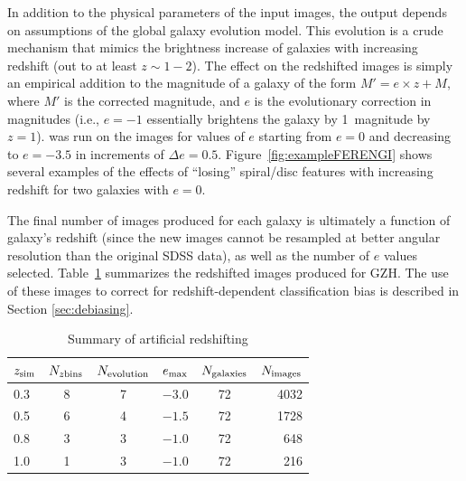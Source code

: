 \documentclass[twocolumn]{aastex6}
\begin{document}
In addition to the physical parameters of the input images, the \ferengi{}
output depends on assumptions of the global galaxy evolution model. This
evolution is a crude mechanism that mimics the brightness increase of galaxies
with increasing redshift (out to at least $z\sim1-2$). The effect on the
redshifted images is simply an empirical addition to the magnitude of a galaxy
of the form $M' = e\times z + M$, where $M'$ is the corrected magnitude, and
$e$ is the evolutionary correction in magnitudes (i.e., $e=-1$ essentially
brightens the galaxy by 1~magnitude by $z=1$). \ferengi{} was run on the images
for values of $e$ starting from $e=0$ and decreasing to $e=-3.5$ in increments
of $\Delta e = 0.5$. Figure~\ref{fig:exampleFERENGI} shows several examples
of the effects of ``losing'' spiral/disc features with increasing redshift
for two galaxies with $e=0$. 

The final number of \ferengi{} images produced for each galaxy is ultimately a
function of galaxy's redshift (since the new images cannot be resampled at
better angular resolution than the original SDSS data), as well as the number
of $e$ values selected. Table~\ref{tbl:ferengivalues} summarizes the redshifted
images produced for GZH. The use of these images to correct for redshift-dependent
classification bias is described in Section \ref{sec:debiasing}.

\begin{table}
\caption{Summary of \ferengi{} artificial redshifting \label{tbl:ferengivalues}}
\begin{tabular}{lccccr}
\hline\hline
$z_{\rm sim}$ & $N_{z {\rm bins}}$ & $N_{\rm evolution}$ & $e_{\rm max}$ & $N_{\rm galaxies}$ & $N_{\rm images}$\\
\hline
0.3              & 8                  & 7                   & $-3.0$        & 72             & 4032 \\
0.5              & 6                  & 4                   & $-1.5$        & 72             & 1728 \\
0.8              & 3                  & 3                   & $-1.0$        & 72             &  648 \\
1.0              & 1                  & 3                   & $-1.0$        & 72             &  216 \\
\hline\hline
\end{tabular}
\end{table}
\end{document}
